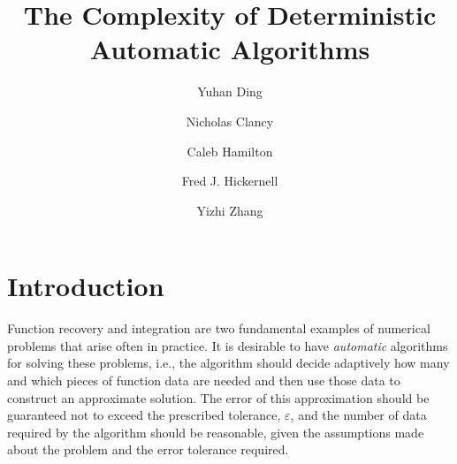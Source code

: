 \documentclass[final]{elsarticle}
\theoremstyle{definition}
\theoremstyle{remark}
\begin{document}
\begin{frontmatter}

\title{The Complexity of Deterministic Automatic Algorithms}
\author{Yuhan Ding}
\author{Nicholas Clancy}
\author{Caleb Hamilton}
\author{Fred J. Hickernell}
\author{Yizhi Zhang}
\address{Room E1-208, Department of Applied Mathematics, Illinois Institute of Technology,\\ 10 W.\ 32$^{\text{nd}}$ St., Chicago, IL 60616}
\begin{abstract}
\end{abstract}

\begin{keyword}


\end{keyword}
\end{frontmatter}

\section{Introduction}
Function recovery and integration are two fundamental examples of numerical problems that arise often in practice.  It is desirable to have \emph{automatic} algorithms for solving these problems, i.e., the algorithm should decide adaptively how many and which pieces of function data are needed and then use those data to construct an approximate solution.  The error of this approximation should be guaranteed not to exceed the prescribed tolerance, $\varepsilon$, and the number of data required by the algorithm should be reasonable, given the assumptions made about the problem and the error tolerance required.
\end{document}

